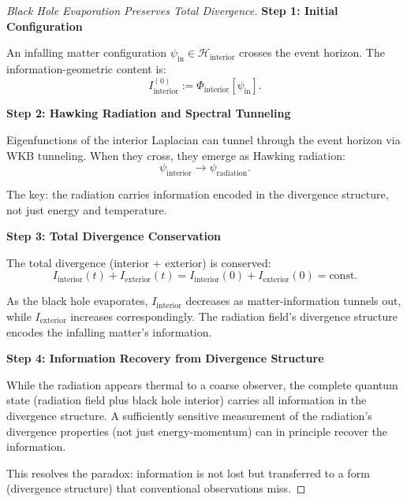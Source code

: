 \begin{theorem}
\begin{proof}[Black Hole Evaporation Preserves Total Divergence]
\textbf{Step 1: Initial Configuration}

An infalling matter configuration $\psi_{\text{in}} \in \mathcal{H}_{\text{interior}}$ crosses the event horizon. The information-geometric content is:
\begin{equation}
I_{\text{interior}}^{(0)} := \Phi_{\text{interior}}[\psi_{\text{in}}].
\end{equation}

\textbf{Step 2: Hawking Radiation and Spectral Tunneling}

Eigenfunctions of the interior Laplacian can tunnel through the event horizon via WKB tunneling. When they cross, they emerge as Hawking radiation:
\begin{equation}
\psi_{\text{interior}} \to \psi_{\text{radiation}}.
\end{equation}

The key: the radiation carries information encoded in the divergence structure, not just energy and temperature.

\textbf{Step 3: Total Divergence Conservation}

The total divergence (interior + exterior) is conserved:
\begin{equation}
I_{\text{interior}}(t) + I_{\text{exterior}}(t) = I_{\text{interior}}(0) + I_{\text{exterior}}(0) = \text{const}.
\end{equation}

As the black hole evaporates, $I_{\text{interior}}$ decreases as matter-information tunnels out, while $I_{\text{exterior}}$ increases correspondingly. The radiation field's divergence structure encodes the infalling matter's information.

\textbf{Step 4: Information Recovery from Divergence Structure}

While the radiation appears thermal to a coarse observer, the complete quantum state (radiation field plus black hole interior) carries all information in the divergence structure. A sufficiently sensitive measurement of the radiation's divergence properties (not just energy-momentum) can in principle recover the information.

This resolves the paradox: information is not lost but transferred to a form (divergence structure) that conventional observations miss.

\end{proof}

\end{theorem}

